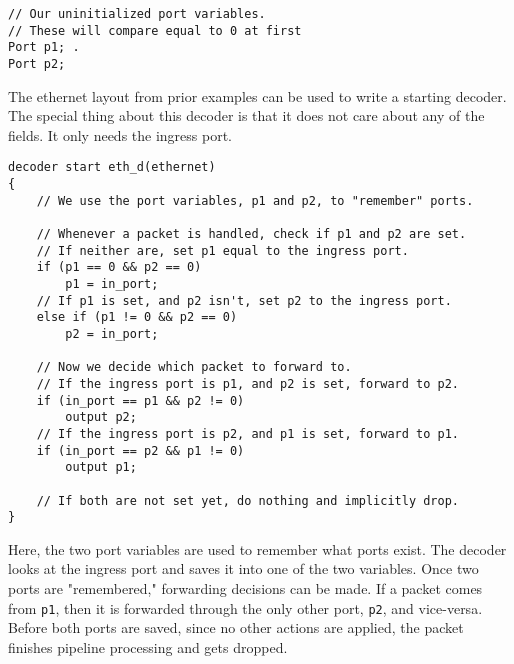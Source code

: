 \begin{codepage}
\begin{lstlisting}
// Our uninitialized port variables.
// These will compare equal to 0 at first
Port p1; .
Port p2;
\end{lstlisting}
\end{codepage}

The ethernet layout from prior examples can be used to write a starting decoder. The
special thing about this decoder is that it does not care about any of the fields.
It only needs the ingress port.

\begin{codepage}
\begin{lstlisting}
decoder start eth_d(ethernet)
{
	// We use the port variables, p1 and p2, to "remember" ports.

	// Whenever a packet is handled, check if p1 and p2 are set.
	// If neither are, set p1 equal to the ingress port.
	if (p1 == 0 && p2 == 0)
		p1 = in_port;
	// If p1 is set, and p2 isn't, set p2 to the ingress port.
	else if (p1 != 0 && p2 == 0)
		p2 = in_port;

	// Now we decide which packet to forward to.
	// If the ingress port is p1, and p2 is set, forward to p2.
	if (in_port == p1 && p2 != 0)
		output p2;
	// If the ingress port is p2, and p1 is set, forward to p1.
	if (in_port == p2 && p1 != 0)
		output p1;

	// If both are not set yet, do nothing and implicitly drop.
}
\end{lstlisting}
\end{codepage}

Here, the two port variables are used to remember what ports exist. The decoder
looks at the ingress port and saves it into one of the two variables. Once two
ports are "remembered," forwarding decisions can be made. If a packet comes from
\texttt{p1}, then it is forwarded through the only other port, \texttt{p2}, and
vice-versa. Before both ports are saved, since no other actions are applied, the
packet finishes pipeline processing and gets dropped.

